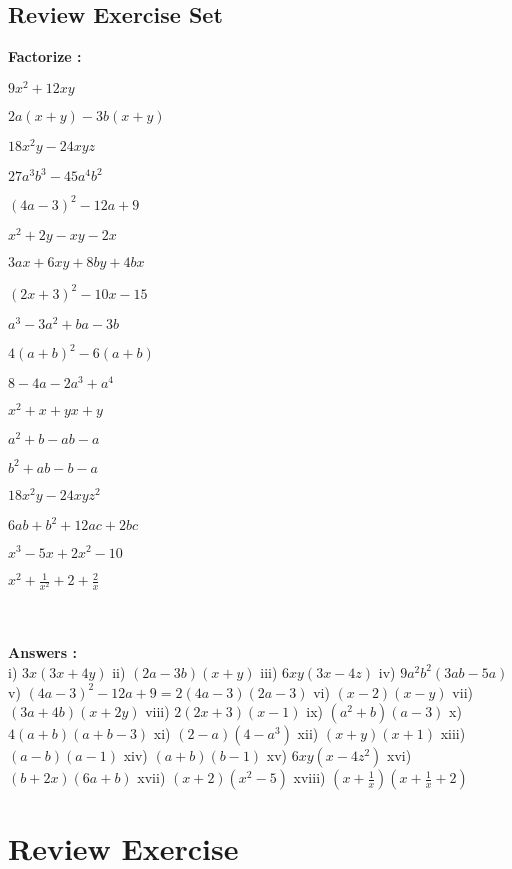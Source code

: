 \documentclass{article}
\begin{document}
\subsection{Review Exercise Set}
\textbf{Factorize :}
\begin{enumerate*}[label=(\roman*)]
	\item $9x^2 + 12xy$ \item $2a(x+y) - 3b(x+y)$ \item $18x^2y - 24xyz$ \item $27a^3b^3 - 45a^4b^2$ \item $(4a - 3)^2 - 12a + 9$ \item $x^2 + 2y - xy - 2x$ \item $3ax + 6xy + 8by + 4bx$ \item $(2x + 3)^2 - 10x - 15$ \item $a^3 - 3a^2 + ba - 3b$ \item $4(a+b)^2 - 6(a+b)$ \item $8 - 4a - 2a^3 + a^4$ \item $x^2 + x + yx + y$ \item $a^2 + b - ab - a$ \item $b^2 + ab - b - a$ \item $18x^2y - 24xyz^2$ \item $6ab + b^2 + 12ac + 2bc$ \item $x^3 - 5x + 2x^2 - 10$ \item $x^2 + \frac{1}{x^2} + 2 + \frac{2}{x}$
\end{enumerate*}\\\\
{\small \textbf{Answers :}}\\
{\footnotesize i) $3x(3x+4y)$} {\footnotesize ii) $(2a-3b)(x+y)$} {\footnotesize iii) $6xy(3x-4z)$} {\footnotesize iv) $9a^2b^2(3ab-5a)$} {\footnotesize v) $(4a-3)^2-12a+9 = 2(4a-3)(2a-3)$} {\footnotesize vi) $(x-2)(x-y)$} {\footnotesize vii) $(3a+4b)(x+2y)$} {\footnotesize viii) $2(2x+3)(x-1)$} {\footnotesize ix) $(a^2+b)(a-3)$} {\footnotesize x) $4(a+b)(a+b-3)$} {\footnotesize xi) $(2-a)(4-a^3)$} {\footnotesize xii) $(x+y)(x+1)$} {\footnotesize xiii) $(a-b)(a-1)$} {\footnotesize xiv) $(a+b)(b-1)$} {\footnotesize xv) $6xy(x-4z^2)$} {\footnotesize xvi) $(b+2x)(6a+b)$} {\footnotesize xvii) $(x+2)(x^2-5)$} {\footnotesize xviii) $(x+\frac{1}{x})(x+\frac{1}{x}+2)$} 
\section{Review Exercise}
\end{document}
